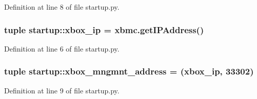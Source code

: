 Definition at line 8 of file startup.py.

\hypertarget{namespacestartup_af9309f386eeba5c078e46609a1b10c15}{
\subsubsection[{xbox\_\-ip}]{\setlength{\rightskip}{0pt plus 5cm}tuple {\bf startup::xbox\_\-ip} = xbmc.getIPAddress()}}
\label{namespacestartup_af9309f386eeba5c078e46609a1b10c15}


Definition at line 6 of file startup.py.

\hypertarget{namespacestartup_af3ab2692b12820ccd095f6263dfe22ce}{
\subsubsection[{xbox\_\-mngmnt\_\-address}]{\setlength{\rightskip}{0pt plus 5cm}tuple {\bf startup::xbox\_\-mngmnt\_\-address} = ({\bf xbox\_\-ip}, 33302)}}
\label{namespacestartup_af3ab2692b12820ccd095f6263dfe22ce}


Definition at line 9 of file startup.py.

